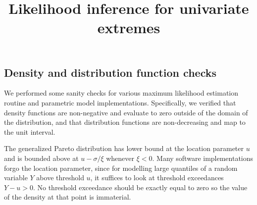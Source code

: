 \documentclass[
  letterpaper,
  DIV=11,
  numbers=noendperiod]{scrartcl}
\title{Likelihood inference for univariate extremes}
\author{}
\date{}
\begin{document}
\maketitle
\ifdefined\Shaded\renewenvironment{Shaded}{\begin{tcolorbox}[interior hidden, enhanced, breakable, sharp corners, frame hidden, boxrule=0pt, borderline west={3pt}{0pt}{shadecolor}]}{\end{tcolorbox}}\fi

\hypertarget{density-and-distribution-function-checks}{%
\subsection{Density and distribution function
checks}\label{density-and-distribution-function-checks}}

We performed some sanity checks for various maximum likelihood
estimation routine and parametric model implementations. Specifically,
we verified that density functions are non-negative and evaluate to zero
outside of the domain of the distribution, and that distribution
functions are non-decreasing and map to the unit interval.

The generalized Pareto distribution has lower bound at the location
parameter \(u\) and is bounded above at \(u -\sigma/\xi\) whenever
\(\xi < 0\). Many software implementations forgo the location parameter,
since for modelling large quantiles of a random variable \(Y\) above
threshold \(u\), it suffices to look at threshold exceedances
\(Y-u >0\). No threshold exceedance should be exactly equal to zero so
the value of the density at that point is immaterial.
\end{document}
